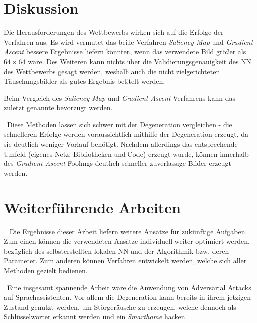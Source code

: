 \section{Diskussion}
Die Herausforderungen des Wettbewerbs wirken sich auf die Erfolge der Verfahren aus. Es wird vermutet das beide Verfahren \textit{Saliency Map} und \textit{Gradient Ascent} bessere Ergebnisse liefern könnten, wenn das verwendete Bild größer als $64\times64$ wäre. Des Weiteren kann nichts über die Validierungsgenauigkeit des \ac{NN} des Wettbewerbs gesagt werden, weshalb auch die nicht zielgerichteten Täuschungsbilder als gutes Ergebnis betitelt werden. 


Beim Vergleich des \textit{Saliency Map} und \textit{Gradient Ascent} Verfahrens kann das zuletzt genannte bevorzugt werden. 

~\newline Diese Methoden lassen sich schwer mit der Degeneration vergleichen - die schnelleren Erfolge werden voraussichtlich mithilfe der Degeneration erzeugt, da sie deutlich weniger Vorlauf benötigt.
Nachdem allerdings das entsprechende Umfeld (eigenes Netz, Bibliotheken und Code) erzeugt wurde, können innerhalb des \textit{Gradient Ascent} Foolings deutlich schneller zuverlässige Bilder erzeugt werden.  



\section{Weiterführende Arbeiten}~\newline 
Die Ergebnisse dieser Arbeit liefern weitere Ansätze für zukünftige Aufgaben. Zum einen können die verwendeten Ansätze individuell weiter optimiert werden, bezüglich des selbsterstellten lokalen \acl{NN} und der Algorithmik bzw. deren Parameter. Zum anderen können Verfahren entwickelt werden, welche sich aller Methoden gezielt bedienen. 


~\newline Eine insgesamt spannende Arbeit wäre die Anwendung von Adversarial Attacks auf Sprachassistenten. 
Vor allem die Degeneration kann bereits in ihrem jetzigen Zustand genutzt werden, um Störgeräusche zu erzeugen, welche dennoch als Schlüsselwörter erkannt werden und ein \textit{Smarthome} hacken. 

